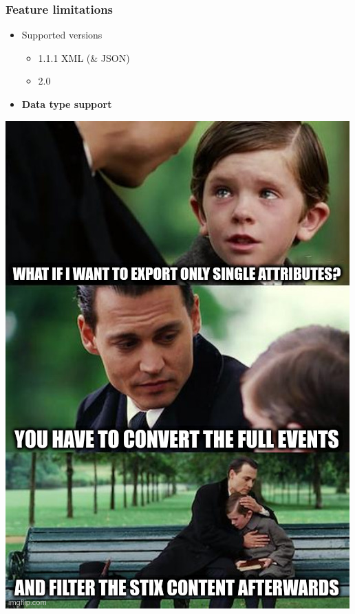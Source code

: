 \begin{frame}
    \frametitle{Feature limitations}
    \begin{minipage}{0.5\textwidth}
        \begin{itemize}
            \item Supported versions
            \begin{itemize}
                \item 1.1.1 XML (\& JSON)
                \item 2.0
            \end{itemize}
            \item {\bf Data type support}
        \end{itemize}
    \end{minipage}%
    \begin{minipage}{0.5\textwidth}
        \centering
        \includegraphics[width=\textwidth]{images/limited_data_type.jpg}
    \end{minipage}
\end{frame}

